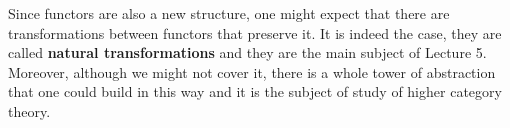 \documentclass{article}
\theoremstyle{definition}
\theoremstyle{remark}
\begin{document}
Since functors are also a new structure, one might expect that there are transformations between functors that preserve it. It is indeed the case, they are called \textbf{natural transformations} and they are the main subject of Lecture 5. Moreover, although we might not cover it, there is a whole tower of abstraction that one could build in this way and it is the subject of study of higher category theory.
\end{document}
